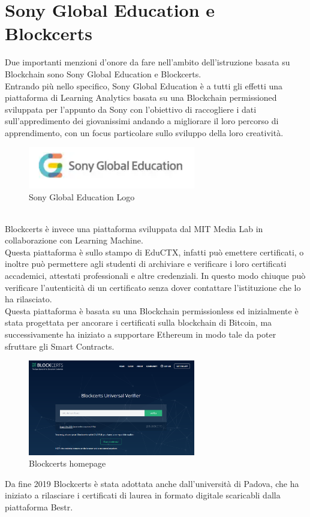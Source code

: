 \section{Sony Global Education e Blockcerts}
Due importanti menzioni d'onore da fare nell'ambito dell'istruzione basata su Blockchain sono Sony Global Education e Blockcerts.
\\Entrando più nello specifico, Sony Global Education è a tutti gli effetti una piattaforma di Learning Analytics basata su una Blockchain permissioned sviluppata per l'appunto da Sony con l'obiettivo di raccogliere i dati 
sull'appredimento dei giovanissimi andando a migliorare il loro percorso di apprendimento, con un focus particolare sullo sviluppo della loro creatività.
\begin{figure}[h]
    \centering
    \includegraphics[width=0.65\textwidth]{Immagini/Sony_Global_Education_logo.PNG}
    \caption{Sony Global Education Logo}
\end{figure}
\\Blockcerts è invece una piattaforma sviluppata dal MIT Media Lab in collaborazione con Learning Machine. 
\\Questa piattaforma è sullo stampo di EduCTX,
infatti può emettere certificati, o inoltre può permettere agli studenti di archiviare e verificare i loro certificati accademici, attestati professionali e altre credenziali.
In questo modo chiuque può verificare l'autenticità di un certificato senza dover contattare l'istituzione che lo ha rilasciato.
\\Questa piattaforma è basata su una Blockchain permissionless ed inizialmente è stata progettata per ancorare i certificati sulla blockchain di Bitcoin, 
ma successivamente ha iniziato a supportare Ethereum in modo tale da poter sfruttare gli Smart Contracts.
\newpage
\begin{figure}[h]
    \centering
    \includegraphics[width=0.65\textwidth]{Immagini/Blockcerts_homepage.PNG}
    \caption{Blockcerts homepage}
\end{figure}
Da fine 2019 Blockcerts è stata adottata anche dall'università di Padova, che ha iniziato a rilasciare i certificati di laurea in formato digitale scaricabli dalla piattaforma Bestr.
